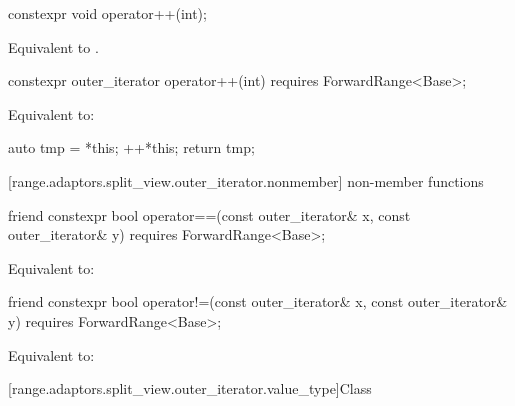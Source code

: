 %
\begin{itemdecl}
constexpr void operator++(int);
\end{itemdecl}

\begin{itemdescr}
\pnum
\effects Equivalent to .
\end{itemdescr}

%
\begin{itemdecl}
constexpr outer_iterator operator++(int) requires ForwardRange<Base>;
\end{itemdecl}

\begin{itemdescr}
\pnum
\effects Equivalent to:
\begin{codeblock}
auto tmp = *this;
++*this;
return tmp;
\end{codeblock}
\end{itemdescr}

[range.adaptors.split_view.outer_iterator.nonmember]{ non-member functions}

%
\begin{itemdecl}
friend constexpr bool operator==(const outer_iterator& x, const outer_iterator& y)
  requires ForwardRange<Base>;
\end{itemdecl}

\begin{itemdescr}
\pnum
\effects Equivalent to: 
\end{itemdescr}

%
\begin{itemdecl}
friend constexpr bool operator!=(const outer_iterator& x, const outer_iterator& y)
  requires ForwardRange<Base>;
\end{itemdecl}

\begin{itemdescr}
\pnum
\effects Equivalent to: 
\end{itemdescr}

[range.adaptors.split_view.outer_iterator.value_type]{Class }

\pnum
\begin{note}
\end{note}

